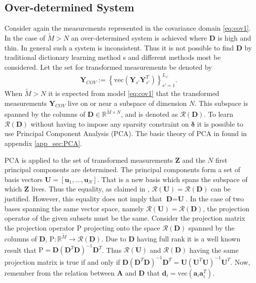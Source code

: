 \subsection{Over-determined System}\label{sec:over_det}
Consider again the measurements represented in the covariance domain \eqref{eq:cov1}.
In the case of $\widetilde{M} > N$ an over-determined system is achieved where $\textbf{D}$ is high and thin. In general such a system is inconsistent. Thus it is not possible to find $\textbf{D}$ by traditional dictionary learning method	s and different methods most be considered.
Let the set for transformed measurements be denoted by 
\begin{align*}
\textbf{Y}_{COV} := \left\{\text{vec}\left( \mathbf{Y}_{s'} \mathbf{Y}_{s'}^T \right) \right\}_{s' = 1}^{L_{s'}}.
\end{align*}
When $ \widetilde{M} > N $ it is expected from model \eqref{eq:cov1} that the transformed measurements $\textbf{Y}_{COV}$ live on or near a subspace of dimension $N$. 
This subspace is spanned by the columns of $\textbf{D}\in\mathbb{R}^{\widetilde{M}\times N}$, and is denoted as $\mathcal{R}(\textbf{D})$. 
To learn $\mathcal{R}(\textbf{D})$ without having to impose any sparsity constraint on $\boldsymbol{\delta}$ it is possible to use Principal Component Analysis (PCA). The basic theory of PCA in found in appendix \ref{app_sec:PCA}. 

PCA is applied to the set of transformed measurements $\textbf{Z}$ and the $N$ first principal components are determined. The principal components form a set of basis vectors $\textbf{U}=[\textbf{u}_1,\hdots, \textbf{u}_N]$. That is a new basis which spans the subspace of which $\textbf{Z}$ lives. Thus the equality, as claimed in \cite{Balkan2015}, $\mathcal{R}(\textbf{U})=\mathcal{R}(\textbf{D})$ can be justified.  
However, this equality does not imply that $\textbf{D}=\textbf{U}$. 
In the case of two bases spanning the same vector space, namely $\mathcal{R}(\textbf{U})=\mathcal{R}(\textbf{D})$, the projection operator of the given subsets must be the same. 
Consider the projection matrix the projection operator $\text{P}$ projecting onto the space $\mathcal{R}(\textbf{D})$ spanned by the columns of $\textbf{D}$, $\text{P}:\mathbb{R}^{\widetilde{M}}\rightarrow \mathcal{R}(\textbf{D})$. Due to $\textbf{D}$ having full rank it is a well known result that $\text{P} = \textbf{D}(\textbf{D}^T\textbf{D})^{-1}\textbf{D}^T$. 
Thus $\mathcal{R}(\textbf{U})$ and $\mathcal{R}(\textbf{D})$ having the same projection matrix is true if and only if $\textbf{D}(\textbf{D}^T\textbf{D})^{-1}\textbf{D}^T=\textbf{U}(\textbf{U}^T\textbf{U})^{-1}\textbf{U}^T$. 
Now, remember from the relation between $\textbf{A}$ and $\textbf{D}$ that $\textbf{d}_i = \text{vec}(\textbf{a}_i\textbf{a}_i^T)$. 

